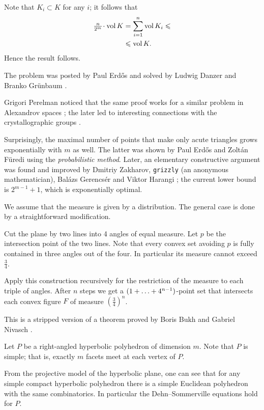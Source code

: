 Note that $K_i\subset K$ for any $i$;
it follows that 
\begin{align*}
\tfrac n{2^m}\cdot \vol K
&=\sum_{i=1}^n\vol K_i\le
\\
&\le\vol K.
\end{align*}
Hence the result follows.
\qeds


The problem was posted by Paul Erd{\H{o}}s \cite{erdos}
and solved by Ludwig Danzer and Branko Gr\"unbaum \cite{danzer-guenbaum}.

Grigori Perelman noticed that the same proof works for a similar problem in Alexandrov spaces \cite{perelman-Erdos};
the later led to interesting connections with the crystallographic groups \cite{lebedeva}.


Surprisingly, the maximal number of points that make only acute triangles grows exponentially with $m$ as well.
The latter was shown by Paul Erd\H{o}s and Zolt\'an F\"uredi \cite{erdos-fueredi} using the \emph{probabilistic method}.
Later, an elementary constructive argument was found and improved by Dmitriy Zakharov,
\texttt{grizzly} (an anonymous mathematician),
Bal{\'a}zs Gerencs{\'e}r and Viktor Harangi
\cite{zakharov,grizzly,gerencser-harangi};
the current lower bound is $2^{m-1}+1$, which is exponentially optimal.

We assume that the measure is given by a distribution.
The general case is done by a straightforward modification.

Cut the plane by two lines into 4 angles of equal measure.
Let $p$ be the intersection point of the two lines.
Note that every convex set avoiding $p$ is fully contained in three angles out of the four.
In particular its measure cannot exceed $\tfrac34$.

Apply this construction recursively for the restriction of the measure to each triple of angles.
After $n$ steps we get a $(1+\z\dots+4^{n-1})$-point set 
that intersects each convex figure $F$ of measure $(\tfrac34)^n$.
\qeds

This is a stripped version of a theorem proved by Boris Bukh and Gabriel Nivasch \cite{bukh-nivasch}.

Let $P$ be a right-angled hyperbolic polyhedron of dimension $m$.
Note that $P$ is simple; 
that is, exactly $m$ facets meet at each vertex of $P$.

From the projective model of the hyperbolic plane, 
one can see that for any simple compact hyperbolic polyhedron there is a simple Euclidean polyhedron with the same combinatorics. 
In particular the Dehn--Sommerville equations hold for $P$.

